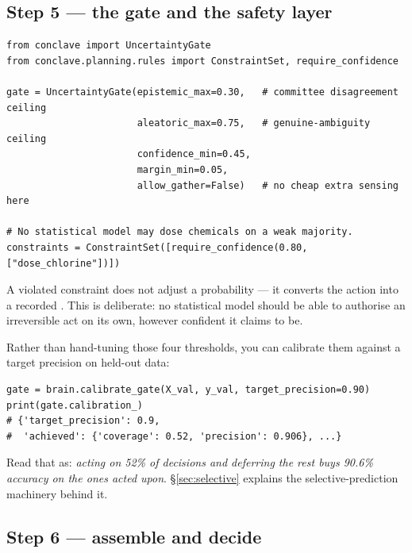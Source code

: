 \subsection{Step 5 --- the gate and the safety layer}

\begin{codebox}
\begin{lstlisting}[style=py]
from conclave import UncertaintyGate
from conclave.planning.rules import ConstraintSet, require_confidence

gate = UncertaintyGate(epistemic_max=0.30,   # committee disagreement ceiling
                       aleatoric_max=0.75,   # genuine-ambiguity ceiling
                       confidence_min=0.45,
                       margin_min=0.05,
                       allow_gather=False)   # no cheap extra sensing here

# No statistical model may dose chemicals on a weak majority.
constraints = ConstraintSet([require_confidence(0.80, ["dose_chlorine"])])
\end{lstlisting}
\end{codebox}

\begin{keybox}
A violated constraint does not adjust a probability --- it converts the action
into a recorded . This is deliberate: no statistical model should
be able to authorise an irreversible act on its own, however confident it
claims to be.
\end{keybox}

\noindent Rather than hand-tuning those four thresholds, you can calibrate them
against a target precision on held-out data:

\begin{codebox}
\begin{lstlisting}[style=py]
gate = brain.calibrate_gate(X_val, y_val, target_precision=0.90)
print(gate.calibration_)
# {'target_precision': 0.9,
#  'achieved': {'coverage': 0.52, 'precision': 0.906}, ...}
\end{lstlisting}
\end{codebox}

\noindent Read that as: \emph{acting on 52\% of decisions and deferring the rest
buys 90.6\% accuracy on the ones acted upon}. \S\ref{sec:selective} explains the
selective-prediction machinery behind it.

\subsection{Step 6 --- assemble and decide}

